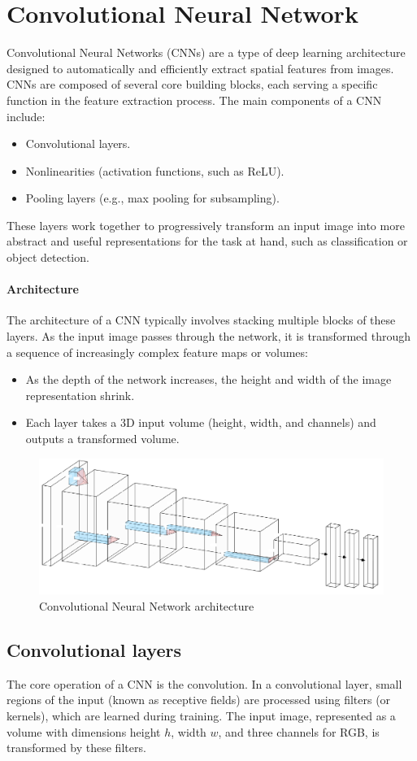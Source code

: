 \section{Convolutional Neural Network}

Convolutional Neural Networks (CNNs) are a type of deep learning architecture designed to automatically and efficiently extract spatial features from images.
CNNs are composed of several core building blocks, each serving a specific function in the feature extraction process. 
The main components of a CNN include:
\begin{itemize}
    \item Convolutional layers.
    \item Nonlinearities (activation functions, such as ReLU).
    \item Pooling layers (e.g., max pooling for subsampling).
\end{itemize}
These layers work together to progressively transform an input image into more abstract and useful representations for the task at hand, such as classification or object detection.

\paragraph*{Architecture}
The architecture of a CNN typically involves stacking multiple blocks of these layers.
As the input image passes through the network, it is transformed through a sequence of increasingly complex feature maps or volumes:
\begin{itemize}
    \item As the depth of the network increases, the height and width of the image representation shrink.
    \item Each layer takes a 3D input volume (height, width, and channels) and outputs a transformed volume.
\end{itemize}
\begin{figure}[H]
    \centering
    \includegraphics[width=0.5\linewidth]{images/cnn.png}
    \caption{Convolutional Neural Network architecture}
\end{figure}

\subsection{Convolutional layers}
The core operation of a CNN is the convolution. In a convolutional layer, small regions of the input (known as receptive fields) are processed using filters (or kernels), which are learned during training. 
The input image, represented as a volume with dimensions height $h$, width $w$, and three channels for RGB, is transformed by these filters.


